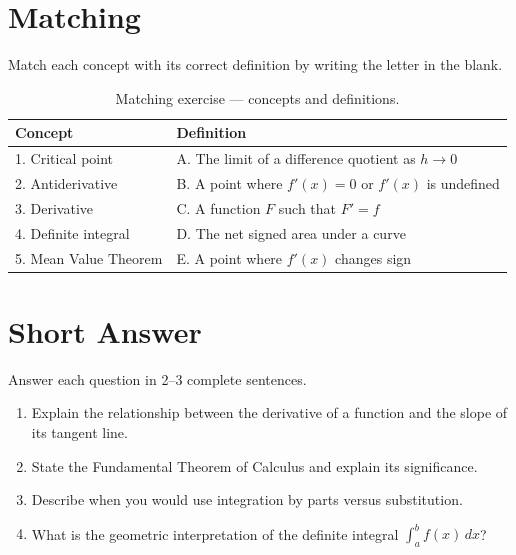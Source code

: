 \documentclass[
    language=english,
    doctype=workbook,
    institution=none,
]{../../omnilatex}
\begin{document}
\section{Matching}

Match each concept with its correct definition by writing the letter in
the blank.

\begin{table}[h]
    \centering
    \begin{tabular}{ll}
        \toprule
        \textbf{Concept} & \textbf{Definition} \\
        \midrule
        \rule{0pt}{2em}1. Critical point & \rule{0pt}{2em}A. The limit of a
            difference quotient as $h \to 0$ \\
        \rule{0pt}{2em}2. Antiderivative & \rule{0pt}{2em}B. A point where
            $f'(x)=0$ or $f'(x)$ is undefined \\
        \rule{0pt}{2em}3. Derivative & \rule{0pt}{2em}C. A function $F$ such
            that $F' = f$ \\
        \rule{0pt}{2em}4. Definite integral & \rule{0pt}{2em}D. The net
            signed area under a curve \\
        \rule{0pt}{2em}5. Mean Value Theorem & \rule{0pt}{2em}E. A point
            where $f'(x)$ changes sign \\
        \bottomrule
    \end{tabular}
    \caption{Matching exercise --- concepts and definitions.}
\end{table}

\section{Short Answer}

Answer each question in 2--3 complete sentences.

\begin{enumerate}[label=\textbf{6.\arabic*}]

    \item Explain the relationship between the derivative of a function and
          the slope of its tangent line.
    \vspace{3cm}

    \item State the Fundamental Theorem of Calculus and explain its
          significance.
    \vspace{3cm}

    \item Describe when you would use integration by parts versus
          substitution.
    \vspace{3cm}

    \item What is the geometric interpretation of the definite integral
          $\int_{a}^{b} f(x)\,dx$?
    \vspace{3cm}

\end{enumerate}
\end{document}
